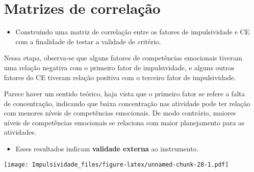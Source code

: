 \documentclass[
]{article}
\newenvironment{Shaded}{\begin{snugshade}}{\end{snugshade}}
\newcommand{\AttributeTok}[1]{\textcolor[rgb]{0.77,0.63,0.00}{#1}}
\newcommand{\DecValTok}[1]{\textcolor[rgb]{0.00,0.00,0.81}{#1}}
\newcommand{\FloatTok}[1]{\textcolor[rgb]{0.00,0.00,0.81}{#1}}
\newcommand{\FunctionTok}[1]{\textcolor[rgb]{0.00,0.00,0.00}{#1}}
\newcommand{\NormalTok}[1]{#1}
\newcommand{\OtherTok}[1]{\textcolor[rgb]{0.56,0.35,0.01}{#1}}
\newcommand{\SpecialCharTok}[1]{\textcolor[rgb]{0.00,0.00,0.00}{#1}}
\newcommand{\StringTok}[1]{\textcolor[rgb]{0.31,0.60,0.02}{#1}}
\providecommand{\tightlist}{%
  \setlength{\itemsep}{0pt}\setlength{\parskip}{0pt}}
\begin{document}
\hypertarget{matrizes-de-correlauxe7uxe3o}{%
\section{Matrizes de correlação}\label{matrizes-de-correlauxe7uxe3o}}

\begin{itemize}
\tightlist
\item
  Construindo uma matriz de correlação entre os fatores de impulsividade
  e CE com a finalidade de testar a validade de critério.
\end{itemize}

Nessa etapa, observa-se que alguns fatores de competências emocionais
tiveram uma relação negativa com o primeiro fator de impulsividade, e
alguns outros fatores do CE tiveram relação positiva com o terceiro
fator de impulsividade.

Parece haver um sentido teórico, haja vista que o primeiro fator se
refere a falta de concentração, indicando que baixa concentração nas
atividade pode ter relação com menores níveis de competências
emocionais. De modo contrário, maiores níveis de competências emocionais
se relaciona com maior planejamento para as atividades.

\begin{itemize}
\tightlist
\item
  Esses resultados indicam \textbf{validade externa} ao instrumento.
\end{itemize}

\begin{Shaded}
\end{Shaded}

\texttt{[image: Impulsividade\_files/figure-latex/unnamed-chunk-28-1.pdf]}
\end{document}
